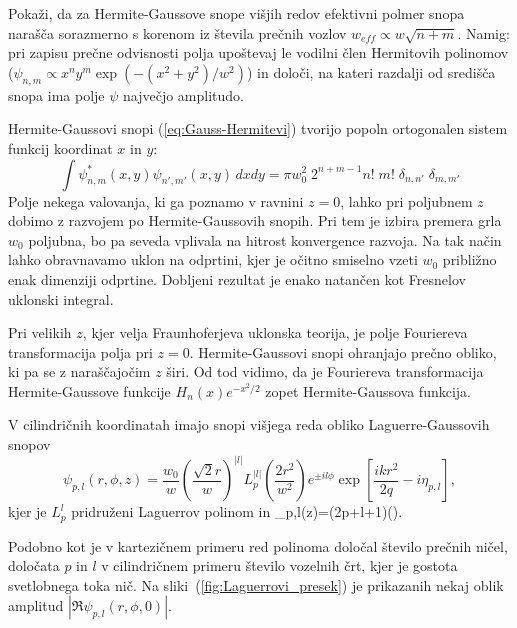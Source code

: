 \begin{definition}
\label{naloga:HG}
Pokaži, da za Hermite-Gaussove snope višjih redov efektivni polmer snopa 
narašča sorazmerno s korenom iz števila prečnih vozlov $ w_{eff}\propto w\sqrt{n+m}$.
Namig: pri zapisu prečne odvisnosti polja upoštevaj le vodilni člen
 Hermitovih polinomov ($\psi_{n,m}\propto x^{n}y^{m}\exp(-(x^{2}+y^{2})/w^{2})$)
 in določi, na kateri razdalji od središča snopa ima polje $\psi$
največjo amplitudo.
\end{definition}


Hermite-Gaussovi snopi (\ref{eq:Gauss-Hermitevi}) tvorijo popoln
ortogonalen sistem funkcij koordinat $x$ in $y$:
\begin{equation}
\int\psi_{n,m}^{*}(x,y)\psi_{n',m'}(x,y)\, dx dy=\pi w_{0}^{2}\; 
2^{n+m-1}n!\;m!\; \delta_{n,n'}\;\delta_{m,m'}
\end{equation}
Polje nekega valovanja, ki ga poznamo v ravnini $z=0$, lahko pri
poljubnem $z$ dobimo z razvojem po Hermite-Gaussovih snopih. Pri tem
je izbira premera grla $w_{0}$ poljubna, bo pa seveda vplivala na
hitrost konvergence razvoja. Na tak način lahko obravnavamo uklon
na odprtini, kjer je očitno smiselno vzeti $w_{0}$ približno enak
dimenziji odprtine. Dobljeni rezultat je enako natančen kot Fresnelov
uklonski integral.


Pri velikih $z$, kjer velja Fraunhoferjeva uklonska teorija, je
polje Fouriereva transformacija polja pri $z=0$. Hermite-Gaussovi
snopi ohranjajo prečno obliko, ki pa se z naraščajočim $z$ širi. 
Od tod vidimo, da je Fouriereva transformacija Hermite-Gaussove funkcije 
$H_{n}(x)e^{-x^{2}/2}$ zopet Hermite-Gaussova funkcija.


V cilindričnih koordinatah imajo snopi višjega reda obliko Laguerre-Gaussovih 
snopov
\begin{equation}
\psi_{p,l}(r,\phi,z)=\frac{w_{0}}{w}\left(\frac{\sqrt{2}r}{w}\right)^{|l|}
L_{p}^{|l|}\left(\frac{2r^{2}}{w^{2}}\right)e^{\pm il\phi}\exp\left[\frac{ikr^{2}}{2q}-i\eta_{p,l}\right],
\label{eq:Gauss-Laguerrevi}
\end{equation}
kjer je $L_{p}^{l}$ pridruženi Laguerrov polinom in 
\beq
\eta_{p,l}\left(z\right)=(2p+l+1)\arctan\left(\right).
\label{eq:etaGL}
\eeq


Podobno kot je v kartezičnem primeru red polinoma določal število prečnih ničel,
določata $p$ in $l$ v cilindričnem primeru število vozelnih črt, kjer je gostota 
svetlobnega toka nič. Na sliki~(\ref{fig:Laguerrovi_presek})
je prikazanih nekaj oblik amplitud $|\Re\psi_{p,l}(r,\phi,0)|$.


